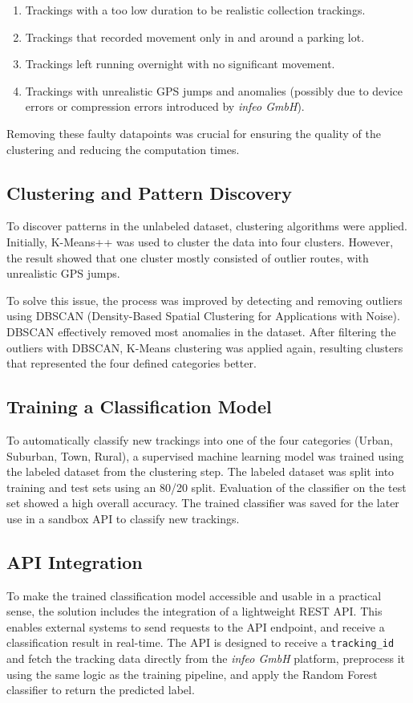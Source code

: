 \documentclass[a4paper,12pt,twoside]{scrreprt}
\begin{document}
\begin{enumerate}
  \item Trackings with a too low duration to be realistic collection trackings.

  \item Trackings that recorded movement only in and around a parking lot.
  \item Trackings left running overnight with no significant movement.
  \item Trackings with unrealistic GPS jumps and anomalies (possibly due to
        device errors or compression errors introduced by \textit{infeo GmbH}).
\end{enumerate}

Removing these faulty datapoints was crucial for ensuring the quality of the
clustering and reducing the computation times.

\subsection{Clustering and Pattern Discovery}
To discover patterns in the unlabeled dataset, clustering algorithms were
applied.
Initially, K-Means++ was used to cluster the data into four clusters. However,
the result showed that one cluster mostly consisted of outlier routes, with
unrealistic GPS jumps.

To solve this issue, the process was improved by detecting and removing
outliers using DBSCAN (Density-Based Spatial Clustering for Applications with
Noise). DBSCAN effectively removed most anomalies in the dataset. After
filtering the outliers with DBSCAN, K-Means clustering was applied again,
resulting clusters that represented the four defined categories better.

\subsection{Training a Classification Model}
To automatically classify new trackings into one of the four categories (Urban,
Suburban, Town, Rural), a supervised machine learning model was trained using
the labeled dataset from the clustering step.
The labeled dataset was split into training and test sets using an 80/20 split.
Evaluation of the classifier on the test set showed a high overall accuracy.
The trained classifier was saved for the later use in a sandbox API to classify
new trackings.

\subsection{API Integration}
To make the trained classification model accessible and usable in a practical
sense, the solution includes the integration of a lightweight REST API.
This enables external systems to send requests to the API endpoint, and
receive a classification result in real-time.
The API is designed to receive a \texttt{tracking\_id} and fetch the tracking
data directly from the \textit{infeo GmbH} platform, preprocess it using the
same logic as the training pipeline, and apply the Random Forest classifier to
return the predicted label.
\end{document}
